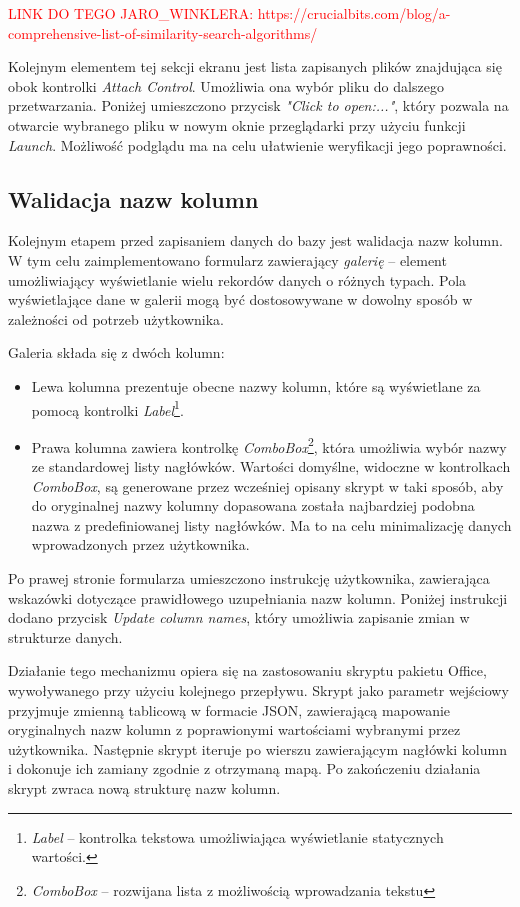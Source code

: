\textcolor{red}{LINK DO TEGO JARO\_WINKLERA: https://crucialbits.com/blog/a-comprehensive-list-of-similarity-search-algorithms/}

Kolejnym elementem tej sekcji ekranu jest lista zapisanych plików znajdująca się obok kontrolki \emph{Attach Control}. Umożliwia ona wybór pliku do dalszego przetwarzania. Poniżej umieszczono przycisk \emph{"Click to open:..."}, który pozwala na otwarcie wybranego pliku w nowym oknie przeglądarki przy użyciu funkcji \emph{Launch}. Możliwość podglądu ma na celu ułatwienie weryfikacji jego poprawności.

\subsection{Walidacja nazw kolumn} Kolejnym etapem przed zapisaniem danych do bazy jest walidacja nazw kolumn. W tym celu zaimplementowano formularz zawierający \emph{galerię} -- element umożliwiający wyświetlanie wielu rekordów danych o różnych typach. Pola wyświetlające dane w galerii mogą być dostosowywane w dowolny sposób w zależności od potrzeb użytkownika.

\noindent Galeria składa się z dwóch kolumn:
\begin{itemize}
    \item Lewa kolumna prezentuje obecne nazwy kolumn, które są wyświetlane za pomocą kontrolki \emph{Label}\footnote{\emph{Label} -- kontrolka tekstowa umożliwiająca wyświetlanie statycznych wartości.}.
    \item Prawa kolumna zawiera kontrolkę \emph{ComboBox}\footnote{\emph{ComboBox} -- rozwijana lista z możliwością wprowadzania tekstu}, która umożliwia wybór nazwy ze standardowej listy nagłówków. Wartości domyślne, widoczne w kontrolkach \emph{ComboBox}, są generowane przez wcześniej opisany skrypt w taki sposób, aby do oryginalnej nazwy kolumny dopasowana została najbardziej podobna nazwa z predefiniowanej listy nagłówków. Ma to na celu minimalizację danych wprowadzonych przez użytkownika.
\end{itemize}

Po prawej stronie formularza umieszczono instrukcję użytkownika, zawierająca wskazówki dotyczące prawidłowego uzupełniania nazw kolumn. Poniżej instrukcji dodano przycisk \emph{Update column names}, który umożliwia zapisanie zmian w strukturze danych.

\noindent Działanie tego mechanizmu opiera się na zastosowaniu skryptu pakietu Office, wywoływanego przy użyciu kolejnego przepływu. Skrypt jako parametr wejściowy przyjmuje zmienną tablicową w formacie JSON, zawierającą mapowanie oryginalnych nazw kolumn z poprawionymi wartościami wybranymi przez użytkownika. Następnie skrypt iteruje po wierszu zawierającym nagłówki kolumn i dokonuje ich zamiany zgodnie z otrzymaną mapą. Po zakończeniu działania skrypt zwraca nową strukturę nazw kolumn.

